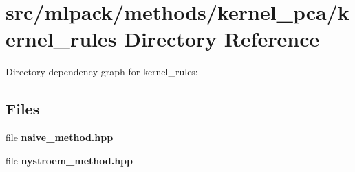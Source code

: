 \section{src/mlpack/methods/kernel\-\_\-pca/kernel\-\_\-rules Directory Reference}
\label{dir_1c76faf66de17da622051ee8994ce266}
Directory dependency graph for kernel\-\_\-rules\-:
\subsection*{Files}
\begin{DoxyCompactItemize}
\item 
file {\bf naive\-\_\-method.\-hpp}
\item 
file {\bf nystroem\-\_\-method.\-hpp}
\end{DoxyCompactItemize}
